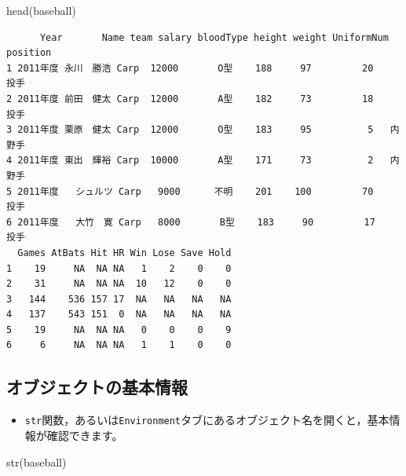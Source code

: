 \documentclass[
  a4paper,
]{ltjsbook}
\newenvironment{Shaded}{\begin{snugshade}}{\end{snugshade}}
\newcommand{\FunctionTok}[1]{\textcolor[rgb]{0.28,0.35,0.67}{#1}}
\newcommand{\NormalTok}[1]{\textcolor[rgb]{0.00,0.23,0.31}{#1}}
\providecommand{\tightlist}{%
  \setlength{\itemsep}{0pt}\setlength{\parskip}{0pt}}\usepackage{longtable,booktabs,array}
\begin{document}
\begin{Shaded}
\begin{Highlighting}[]
\FunctionTok{head}\NormalTok{(baseball)}
\end{Highlighting}
\end{Shaded}

\begin{verbatim}
      Year       Name team salary bloodType height weight UniformNum position
1 2011年度 永川　勝浩 Carp  12000       O型    188     97         20     投手
2 2011年度 前田　健太 Carp  12000       A型    182     73         18     投手
3 2011年度 栗原　健太 Carp  12000       O型    183     95          5   内野手
4 2011年度 東出　輝裕 Carp  10000       A型    171     73          2   内野手
5 2011年度   シュルツ Carp   9000      不明    201    100         70     投手
6 2011年度   大竹　寛 Carp   8000       B型    183     90         17     投手
  Games AtBats Hit HR Win Lose Save Hold
1    19     NA  NA NA   1    2    0    0
2    31     NA  NA NA  10   12    0    0
3   144    536 157 17  NA   NA   NA   NA
4   137    543 151  0  NA   NA   NA   NA
5    19     NA  NA NA   0    0    0    9
6     6     NA  NA NA   1    1    0    0
\end{verbatim}

\subsection{オブジェクトの基本情報}\label{ux30aaux30d6ux30b8ux30a7ux30afux30c8ux306eux57faux672cux60c5ux5831}

\begin{itemize}
\tightlist
\item
  \texttt{str}関数，あるいは\texttt{Environment}タブにあるオブジェクト名を開くと，基本情報が確認できます。
\end{itemize}

\begin{Shaded}
\begin{Highlighting}[]
\FunctionTok{str}\NormalTok{(baseball)}
\end{Highlighting}
\end{Shaded}
\end{document}

